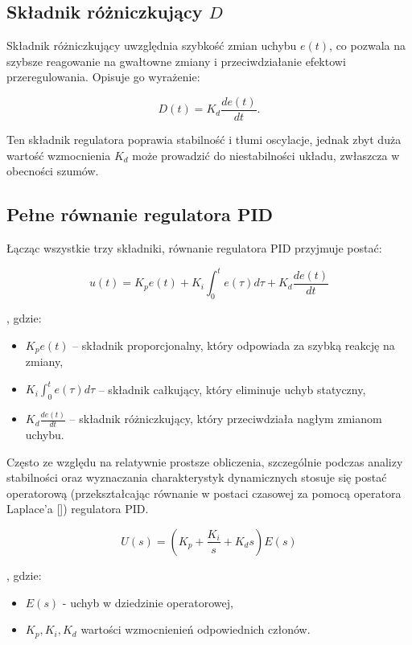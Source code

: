 \subsection{Składnik różniczkujący $D$}

Składnik różniczkujący uwzględnia szybkość zmian uchybu $e(t)$, co pozwala na szybsze reagowanie na gwałtowne zmiany i przeciwdziałanie efektowi przeregulowania. Opisuje go wyrażenie:

\begin{equation}
D(t) = K_d \frac{de(t)}{dt} .
\end{equation}

Ten składnik regulatora poprawia stabilność i tłumi oscylacje, jednak zbyt duża wartość wzmocnienia $K_d$ może prowadzić do niestabilności układu, zwłaszcza w obecności szumów.

\subsection{Pełne równanie regulatora PID}

Łącząc wszystkie trzy składniki, równanie regulatora PID przyjmuje postać:

\begin{equation}
u(t) = K_p e(t) + K_i \int_{0}^{t} e(\tau) d\tau + K_d \frac{de(t)}{dt}
\end{equation}

, gdzie:
\begin{itemize}
    \item $K_p e(t)$ – składnik proporcjonalny, który odpowiada za szybką reakcję na zmiany,
    \item $K_i \int_{0}^{t} e(\tau) d\tau$ – składnik całkujący, który eliminuje uchyb statyczny,
    \item $K_d \frac{de(t)}{dt}$ – składnik różniczkujący, który przeciwdziała nagłym zmianom uchybu.
\end{itemize}

Często ze względu na relatywnie prostsze obliczenia, szczególnie podczas analizy stabilności oraz wyznaczania charakterystyk dynamicznych stosuje się postać operatorową (przekształcając równanie w postaci czasowej za pomocą operatora Laplace’a []) regulatora PID. 

\begin{equation}
    U(s) = (K_p + \frac{K_i}{s} + K_d s) E(s)
\end{equation}

, gdzie:
\begin{itemize}
    \item $E(s)$ - uchyb w dziedzinie operatorowej,
    \item $K_p, K_i, K_d$ wartości wzmocnienień odpowiednich członów.
\end{itemize}


